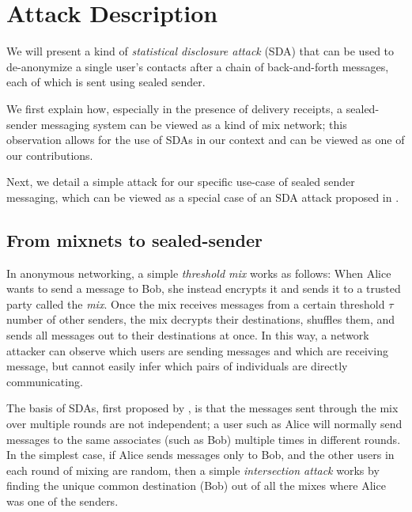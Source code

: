 \section{Attack Description}\label{sec:signal-attack}

We will present a kind of \emph{statistical disclosure attack} (SDA)
that can be used to de-anonymize a single user's contacts after a chain
of back-and-forth messages, each of which is sent using sealed sender.

We first explain how, especially in the presence of delivery receipts, a
sealed-sender messaging system can be viewed as a kind of mix network;
this observation allows for the use of SDAs in our context and can be
viewed as one of our contributions.

Next, we detail a simple attack for our specific use-case of sealed
sender messaging, which can be viewed as a special case of an SDA attack
proposed in \cite{SDA-MD05}. 

\subsection{From mixnets to sealed-sender}

In anonymous networking, a simple \emph{threshold mix} works as follows:
When Alice wants to send a message to Bob, she instead encrypts it and
sends it to a trusted party called the \emph{mix}.
Once the mix receives messages from a certain
threshold $\tau$ number of other senders, the mix decrypts their destinations,
shuffles them, and sends all messages out to their destinations at once.
In this way, a network attacker can observe which users are sending messages and which are receiving message, but cannot easily infer which pairs of individuals are directly communicating.

The basis of SDAs, first proposed by \cite{SDA},
is that the messages sent through the mix over multiple
rounds are not independent; a user such as Alice will normally send
messages to the same associates (such as Bob) multiple times in
different rounds. In the simplest case, if Alice sends messages only to
Bob, and the other users in each round of mixing are random, then a
simple \emph{intersection attack} works by finding the unique common
destination (Bob) out of all the mixes where Alice was one of the
senders.

